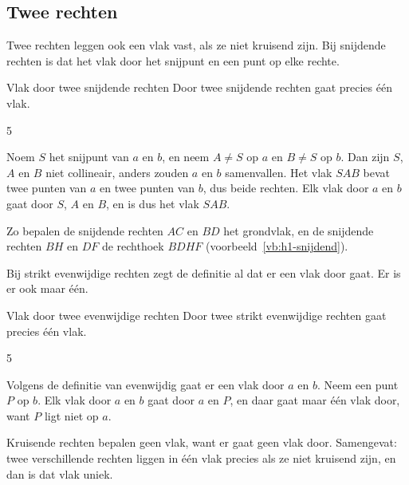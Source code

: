 \subsection{Twee rechten}

Twee rechten leggen ook een vlak vast, als ze niet kruisend zijn. Bij snijdende rechten is dat het vlak door het snijpunt en een punt op elke rechte.

\begin{theorie}
\begin{stelling}{Vlak door twee snijdende rechten}
Door twee snijdende rechten gaat precies één vlak.
\end{stelling}
\begin{alleenvoor}{5}
\begin{bewijs}
Noem $S$ het snijpunt van $a$ en $b$, en neem $A \neq S$ op $a$ en $B \neq S$ op $b$. Dan zijn $S$, $A$ en $B$ niet collineair, anders zouden $a$ en $b$ samenvallen. Het vlak $SAB$ bevat twee punten van $a$ en twee punten van $b$, dus beide rechten. Elk vlak door $a$ en $b$ gaat door $S$, $A$ en $B$, en is dus het vlak $SAB$.
\end{bewijs}
\end{alleenvoor}
\end{theorie}

Zo bepalen de snijdende rechten $AC$ en $BD$ het grondvlak, en de snijdende rechten $BH$ en $DF$ de rechthoek $BDHF$ (voorbeeld~\ref{vb:h1-snijdend}).

Bij strikt evenwijdige rechten zegt de definitie al dat er een vlak door gaat. Er is er ook maar één.

\begin{theorie}
\begin{stelling}{Vlak door twee evenwijdige rechten}
Door twee strikt evenwijdige rechten gaat precies één vlak.
\end{stelling}
\begin{alleenvoor}{5}
\begin{bewijs}
Volgens de definitie van evenwijdig gaat er een vlak door $a$ en $b$. Neem een punt $P$ op $b$. Elk vlak door $a$ en $b$ gaat door $a$ en $P$, en daar gaat maar één vlak door, want $P$ ligt niet op $a$.
\end{bewijs}
\end{alleenvoor}
\end{theorie}

Kruisende rechten bepalen geen vlak, want er gaat geen vlak door. Samengevat: twee verschillende rechten liggen in één vlak precies als ze niet kruisend zijn, en dan is dat vlak uniek.

